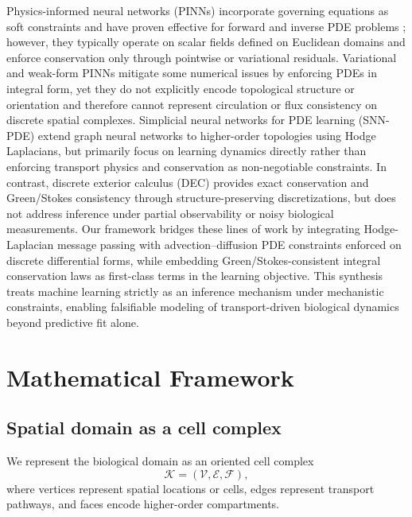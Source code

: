 \documentclass[10pt,article]{article}
\begin{document}
Physics-informed neural networks (PINNs) incorporate governing equations as soft constraints and have proven effective for forward and inverse PDE problems \cite{raissi2019physics}; however, they typically operate on scalar fields defined on Euclidean domains and enforce conservation only through pointwise or variational residuals. Variational and weak-form PINNs mitigate some numerical issues by enforcing PDEs in integral form, yet they do not explicitly encode topological structure or orientation and therefore cannot represent circulation or flux consistency on discrete spatial complexes. Simplicial neural networks for PDE learning (SNN-PDE) extend graph neural networks to higher-order topologies using Hodge Laplacians, but primarily focus on learning dynamics directly rather than enforcing transport physics and conservation as non-negotiable constraints. In contrast, discrete exterior calculus (DEC) provides exact conservation and Green/Stokes consistency through structure-preserving discretizations, but does not address inference under partial observability or noisy biological measurements. Our framework bridges these lines of work by integrating Hodge-Laplacian message passing with advection–diffusion PDE constraints enforced on discrete differential forms, while embedding Green/Stokes-consistent integral conservation laws as first-class terms in the learning objective. This synthesis treats machine learning strictly as an inference mechanism under mechanistic constraints, enabling falsifiable modeling of transport-driven biological dynamics beyond predictive fit alone.
\section{Mathematical Framework}

\subsection{Spatial domain as a cell complex}

We represent the biological domain as an oriented cell complex
\begin{equation}
\mathcal{K} = (\mathcal{V}, \mathcal{E}, \mathcal{F}),
\end{equation}
where vertices represent spatial locations or cells, edges represent transport pathways, and faces encode higher-order compartments.
\end{document}
